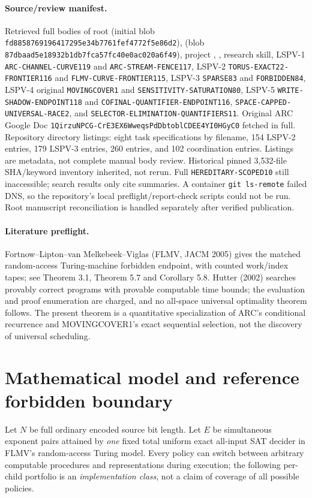 \documentclass[11pt]{article}
\begin{document}
\paragraph{Source/review manifest.}
Retrieved full bodies of root  (initial blob \texttt{fd8858769196417295e34b7761fef4772f5e86d2}),  (blob \texttt{87dbaad5e18932b1db7fca57fc40e0ac020a6f49}), project , , research skill, LSPV-1 \texttt{ARC-CHANNEL-CURVE119} and \texttt{ARC-STREAM-FENCE117}, LSPV-2 \texttt{TORUS-EXACT22-FRONTIER116} and \texttt{FLMV-CURVE-FRONTIER115}, LSPV-3 \texttt{SPARSE83} and \texttt{FORBIDDEN84}, LSPV-4 original \texttt{MOVINGCOVER1} and \texttt{SENSITIVITY-SATURATION80}, LSPV-5 \texttt{WRITE-SHADOW-ENDPOINT118} and \texttt{COFINAL-QUANTIFIER-ENDPOINT116}, \texttt{SPACE-CAPPED-UNIVERSAL-RACE2}, and \texttt{SELECTOR-ELIMINATION-QUANTIFIERS11}. Original ARC Google Doc \texttt{1QirzuNPCG-CrE3EX6WweqsPdDbtoblCDEE4YI0HGyC0} fetched in full. Repository directory listings: eight task specifications by filename, 154 LSPV-2 entries, 179 LSPV-3 entries, 260  entries, and 102 coordination entries. Listings are metadata, not complete manual body review. Historical pinned 3,532-file SHA/keyword inventory inherited, not rerun. Full \texttt{HEREDITARY-SCOPED10} still inaccessible; search results only cite summaries. A container \texttt{git ls-remote} failed DNS, so the repository's local preflight/report-check scripts could not be run. Root manuscript reconciliation is handled separately after verified publication.

\paragraph{Literature preflight.}
Fortnow--Lipton--van Melkebeek--Viglas (FLMV, JACM 2005) gives the matched random-access Turing-machine forbidden endpoint, with counted work/index tapes; see Theorem 3.1, Theorem 5.7 and Corollary 5.8. Hutter (2002) searches provably correct programs with provable computable time bounds; the evaluation and proof enumeration are charged, and no all-space universal optimality theorem follows. The present theorem is a quantitative specialization of ARC's conditional recurrence and MOVINGCOVER1's exact sequential selection, not the discovery of universal scheduling.

\section{Mathematical model and reference forbidden boundary}
Let $N$ be full ordinary encoded source bit length. Let $E$ be simultaneous exponent pairs attained by \emph{one} fixed total uniform exact all-input SAT decider in FLMV's random-access Turing model. Every policy can switch between arbitrary computable procedures and representations during execution; the following per-child portfolio is an \emph{implementation class}, not a claim of coverage of all possible policies.
\end{document}
